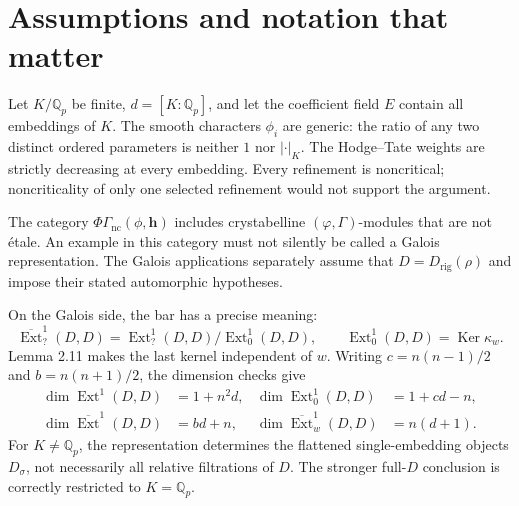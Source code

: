 \documentclass[10pt]{article}
\begin{document}
\section*{Assumptions and notation that matter}
Let \(K/\mathbb Q_p\) be finite, \(d=[K:\mathbb Q_p]\), and let the coefficient field \(E\) contain all embeddings of \(K\). The smooth characters \(\phi_i\) are generic: the ratio of any two distinct ordered parameters is neither \(1\) nor \(|\cdot|_K\). The Hodge–Tate weights are strictly decreasing at every embedding. Every refinement is noncritical; noncriticality of only one selected refinement would not support the argument.\par
The category \(\Phi\Gamma_{\mathrm{nc}}(\phi,\mathbf h)\) includes crystabelline \((\varphi,\Gamma)\)-modules that are not étale. An example in this category must not silently be called a Galois representation. The Galois applications separately assume that \(D=D_{\mathrm{rig}}(\rho)\) and impose their stated automorphic hypotheses.\par
On the Galois side, the bar has a precise meaning: \[\overline{\operatorname{Ext}}^1_?(D,D)=\operatorname{Ext}^1_?(D,D)/\operatorname{Ext}^1_0(D,D),\qquad
 \operatorname{Ext}^1_0(D,D)=\operatorname{Ker}\kappa_w .\] Lemma 2.11 makes the last kernel independent of \(w\). Writing \(c=n(n-1)/2\) and \(b=n(n+1)/2\), the dimension checks give \[\begin{aligned}
 \dim\operatorname{Ext}^1(D,D)&=1+n^2d,&
 \dim\operatorname{Ext}^1_0(D,D)&=1+cd-n,\\
 \dim\overline{\operatorname{Ext}}^1(D,D)&=bd+n,&
 \dim\overline{\operatorname{Ext}}^1_w(D,D)&=n(d+1).\end{aligned}\] For \(K\ne\mathbb Q_p\), the representation determines the flattened single-embedding objects \(D_\sigma\), not necessarily all relative filtrations of \(D\). The stronger full-\(D\) conclusion is correctly restricted to \(K=\mathbb Q_p\).\par
\end{document}
